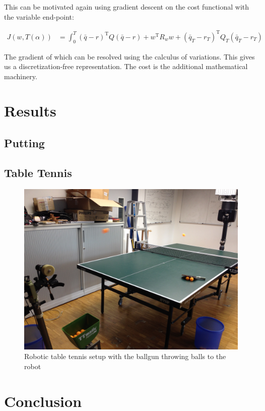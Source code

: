 \documentclass[10pt,a4paper]{article}
\newcommand{\joint}{q} %
\newcommand{\state}{\bar{\joint}} %
\newcommand{\traj}{r} %
\newcommand{\weights}{w} %
\begin{document}
This can be motivated again using gradient descent on the cost functional with the variable end-point:

\begin{equation}
\begin{aligned}
J(\weights,T(\alpha)) &= \int_{0}^{T} (\state - \traj)^{\mathrm{T}}Q(\state - \traj) + \weights^{\mathrm{T}}R_w\weights + (\state_T-\traj_T)^{\mathrm{T}}Q_{T}(\state_T-\traj_T) 
\end{aligned}
\label{costTimeVarying}
\end{equation}

The gradient of which can be resolved using the calculus of variations. This gives us a discretization-free representation. The cost is the additional mathematical machinery.

\section{Results}


\subsection{Putting}

\subsection{Table Tennis}

\begin{figure}
\center
\includegraphics[scale=0.05, angle= 180]{ballgun.jpg}			
\caption{Robotic table tennis setup with the ballgun throwing balls to the robot}
\end{figure}

\section{Conclusion}


%
%

\end{document}
